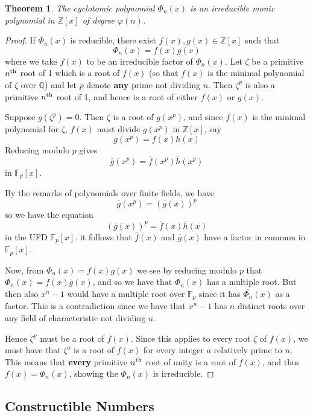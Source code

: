 \documentclass[10pt, oneside, reqno]{amsart}
\theoremstyle{plain}%
\newtheorem{thm}{Theorem}[section]
\theoremstyle{definition}
\theoremstyle{remark}
\newcommand{\Q}{\mathbb{Q}}
\newcommand{\Z}{\mathbb{Z}}
\newcommand{\F}{\mathbb{F}}
\newcommand{\nth}{n\textsuperscript{th}}
\begin{document}
\begin{thm}
    The cyclotomic polynomial $\Phi_n(x)$ is an irreducible monic polynomial in $\Z[x]$ of degree $\varphi(n)$.
\end{thm}
\begin{proof}
    If $\Phi_n(x)$ is reducible, there exist $f(x), g(x) \in \Z[x]$ such that \[
        \Phi_n(x) = f(x) g(x)
    \] where we take $f(x)$ to be an irreducible factor of $\Phi_n(x)$.  Let $\zeta$ be a primitive $\nth$ root of 1 which is a root of $f(x)$ (so that $f(x)$ is the minimal polynomial of $\zeta$ over $\Q$) and let $p$ denote \textbf{any} prime not dividing $n$.  Then $\zeta^p$ is also a primitive $\nth$ root of 1, and hence is a root of either $f(x)$ or $g(x)$.
    
    Suppose $g(\zeta^p) = 0$.  Then $\zeta$ is a root of $g(x^p)$, and since $f(x)$ is the minimal polynomial for $\zeta$, $f(x)$ must divide $g(x^p)$ in $\Z[x]$, say \[
        g(x^p) = f(x) h(x)
    \] Reducing modulo $p$ gives \[
        \overline{g}(x^p) = \overline{f}(x^p) \overline{h}(x^p)
    \] in $\F_p[x]$. 
    
    By the remarks of polynomials over finite fields, we have\[
        \overline{g}(x^p) = (\overline{g}(x))^p
    \] so we have the equation \[
        (\overline{g}(x))^p = \overline{f}(x)\overline{h}(x)
    \] in the UFD $\F_p[x]$.  it follows that $\overline{f}(x)$ and $\overline{g}(x)$ have a factor in common in $\F_p[x]$.
    
    Now, from $\Phi_n(x) = f(x)g(x)$ we see by reducing modulo $p$ that $\overline{\Phi_n}(x) = \overline{f}(x) \overline{g}(x)$, and so we have that $\overline{\Phi_n}(x)$ has a multiple root.  But then also $x^n - 1$ would have a multiple root over $\F_p$ since it has $\overline{\Phi_n}(x)$ as a factor.  This is a contradiction since we have that $x^n - 1$ has $n$ distinct roots over any field of characteristic not dividing $n$. 
    
    Hence $\zeta^p$ must be a root of $f(x)$.  Since this applies to every root $\zeta$ of $f(x)$, we must have that $\zeta^a$ is a root of $f(x)$ for every integer $a$ relatively prime to $n$.  This means that \textbf{every} primitive $\nth$ root of unity is a root of $f(x)$, and thus $f(x) = \Phi_n(x)$, showing the $\Phi_n(x)$ is irreducible.
\end{proof}



\subsection{Constructible Numbers} %
\label{sub:constructible_number}
\end{document}
